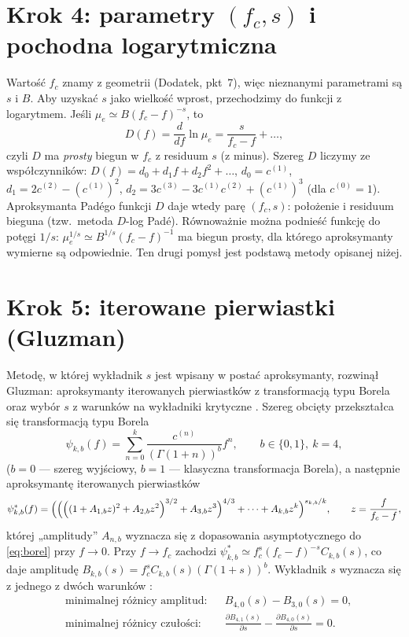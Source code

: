 \documentclass[12pt,a4paper,twoside,openright]{report}
\theoremstyle{definition}
\theoremstyle{remark}
\begin{document}
\section{\texorpdfstring{Krok 4: parametry $(f_c,s)$ i pochodna logarytmiczna}{Krok 4: parametry (f\_c,s) i pochodna logarytmiczna}}

Wartość $f_c$ znamy z geometrii (Dodatek, pkt~7), więc nieznanymi parametrami są $s$ i $B$. Aby uzyskać $s$ jako wielkość wprost, przechodzimy do funkcji z logarytmem. Jeśli $\mu_e\simeq B(f_c-f)^{-s}$, to
\begin{equation*}
{D(f)=\frac{d}{df}\ln\mu_e=\frac{s}{f_c-f}+\dots,}
\end{equation*}
czyli $D$ ma \emph{prosty} biegun w $f_c$ z residuum $s$ (z minus). Szereg $D$ liczymy ze współczynników: $D(f)=d_0+d_1f+d_2f^2+\dots$, $d_0=c^{(1)}$, $d_1=2c^{(2)}-(c^{(1)})^2$, $d_2=3c^{(3)}-3c^{(1)}c^{(2)}+(c^{(1)})^3$ (dla $c^{(0)}=1$). Aproksymanta Padégo funkcji $D$ daje wtedy parę $(f_c,s)$: położenie i residuum bieguna (tzw.\ metoda $D$-log Padé). Równoważnie można podnieść funkcję do potęgi $1/s$: $\mu_e^{1/s}\simeq B^{1/s}(f_c-f)^{-1}$ ma biegun prosty, dla którego aproksymanty wymierne są odpowiednie. Ten drugi pomysł jest podstawą metody opisanej niżej.

\section{\texorpdfstring{Krok 5: iterowane pierwiastki (Gluzman)}{Krok 5: iterowane pierwiastki (Gluzman)}}

Metodę, w której wykładnik $s$ jest wpisany w postać aproksymanty, rozwinął Gluzman: aproksymanty iterowanych pierwiastków z transformacją typu Borela \cite{gluzman2022iterative} oraz wybór $s$ z warunków na wykładniki krytyczne \cite{Gluzman2024CriticalIndices}. Szereg obcięty przekształca się transformacją typu Borela
\begin{equation}\label{eq:borel}
\psi_{k,b}(f)=\sum_{n=0}^{k}\frac{c^{(n)}}{(\Gamma(1+n))^{b}}f^n,\qquad b\in\{0,1\},\ k=4,
\end{equation}
($b=0$ --- szereg wyjściowy, $b=1$ --- klasyczna transformacja Borela), a następnie aproksymantę iterowanych pierwiastków \cite{gluzman2022iterative}
\begin{equation}\label{eq:root}
\psi^*_{k,b}(f)=\Bigl(\Bigl(\Bigl((1+A_{1,b}z)^2+A_{2,b}z^2\Bigr)^{3/2}+A_{3,b}z^3\Bigr)^{4/3}+\dots+A_{k,b}z^k\Bigr)^{s_{k,b}/k},\qquad z=\frac{f}{f_c-f},
\end{equation}
której „amplitudy” $A_{n,b}$ wyznacza się z dopasowania asymptotycznego do \eqref{eq:borel} przy $f\to0$. Przy $f\to f_c$ zachodzi $\psi^*_{k,b}\simeq f_c^{s}(f_c-f)^{-s}C_{k,b}(s)$, co daje amplitudę $B_{k,b}(s)=f_c^{s}C_{k,b}(s)(\Gamma(1+s))^b$. Wykładnik $s$ wyznacza się z jednego z dwóch warunków \cite{Gluzman2024CriticalIndices}:
\begin{align}
&\text{minimalnej różnicy amplitud:}&&B_{4,0}(s)-B_{3,0}(s)=0,\label{eq:md}\\
&\text{minimalnej różnicy czułości:}&&\frac{\partial B_{4,1}(s)}{\partial s}-\frac{\partial B_{4,0}(s)}{\partial s}=0.\label{eq:msd}
\end{align}
\end{document}
